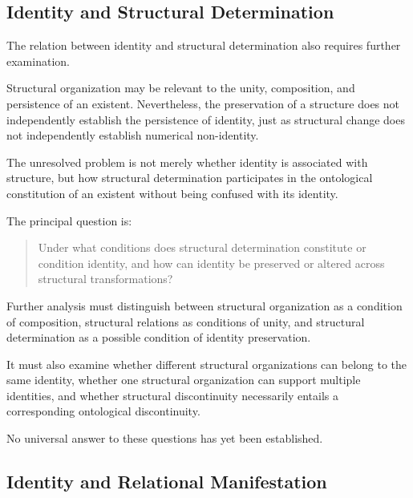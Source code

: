
\subsection{Identity and Structural Determination}

The relation between identity and structural determination
also requires further examination.

Structural organization may be relevant to the unity,
composition, and persistence of an existent. Nevertheless,
the preservation of a structure does not independently
establish the persistence of identity, just as structural
change does not independently establish numerical
non-identity.

The unresolved problem is not merely whether identity
is associated with structure, but how structural
determination participates in the ontological constitution
of an existent without being confused with its identity.

The principal question is:

\begin{quote}
Under what conditions does structural determination
constitute or condition identity, and how can identity
be preserved or altered across structural transformations?
\end{quote}

Further analysis must distinguish between structural
organization as a condition of composition, structural
relations as conditions of unity, and structural
determination as a possible condition of identity
preservation.

It must also examine whether different structural
organizations can belong to the same identity, whether
one structural organization can support multiple
identities, and whether structural discontinuity
necessarily entails a corresponding ontological
discontinuity.

No universal answer to these questions has yet been
established.


\subsection{Identity and Relational Manifestation}

